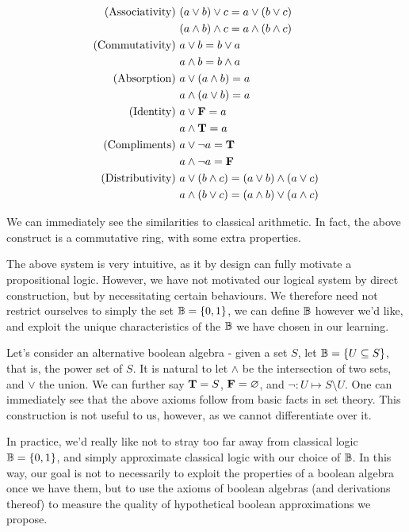 $$
\begin{aligned}
\text{(Associativity)}
&\ (a \lor b) \lor c = a \lor (b \lor c) \\
&\ (a \land b) \land c = a \land (b \land c) \\
\text{(Commutativity)}
&\ a \lor b = b \lor a \\
&\ a \land b = b \land a \\
\text{(Absorption)}
&\ a \lor (a \land b) = a \\
&\ a \land (a \lor b) = a \\
\text{(Identity)}
&\ a \lor \textbf{F} = a \\
&\ a \land \textbf{T} = a \\
\text{(Compliments)}
&\ a \lor \neg a = \textbf{T} \\
&\ a \land \neg a = \textbf{F} \\
\text{(Distributivity)}
&\ a \lor (b \land c) = (a \lor b) \land (a \lor c) \\
&\ a \land (b \lor c) = (a \land b) \lor (a \land c) \\
\end{aligned}
$$

We can immediately see the similarities to classical arithmetic. In fact, the above construct is a commutative ring, with some extra properties. 

The above system is very intuitive, as it by design can fully motivate a propositional logic. However, we have not motivated our logical system by direct construction, but by necessitating certain behaviours. We therefore need not restrict ourselves to simply the set $\mathbb{B}=\{0,1\}$, we can define $\mathbb{B}$ however we'd like, and exploit the unique characteristics of the $\mathbb{B}$ we have chosen in our learning.

Let's consider an alternative boolean algebra - given a set $S$, let $\mathbb{B} = {\{ U \subseteq S \}}$, that is, the power set of $S$. It is natural to let $\land$ be the intersection of two sets, and $\lor$ the union. We can further say $\textbf{T} = S$, $\textbf{F} = \varnothing$, and $\neg:U \mapsto S \setminus U$. One can immediately see that the above axioms follow from basic facts in set theory. This construction is not useful to us, however, as we cannot differentiate over it.

In practice, we'd really like not to stray too far away from classical logic $\mathbb{B} = \{0,1\}$, and simply approximate classical logic with our choice of $\mathbb{B}$. In this way, our goal is not to necessarily to exploit the properties of a boolean algebra once we have them, but to use the axioms of boolean algebras (and derivations thereof) to measure the quality of hypothetical boolean approximations we propose.

